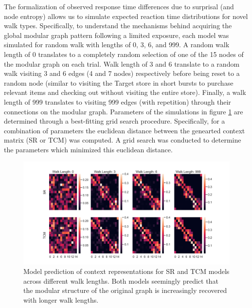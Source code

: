 The formalization of observed response time differences due to surprisal (and node entropy) allows us to simulate expected reaction time distributions for novel walk types. Specifically, to understand the mechanisms behind acquiring the global modular graph pattern following a limited exposure, each model was simulated for random walk with lengths of 0, 3, 6, and 999. A random walk length of 0 translates to a completely random selection of one of the 15 nodes of the modular graph on each trial. Walk length of 3 and 6 translate to a random walk visiting 3 and 6 edges (4 and 7 nodes) respectively before being reset to a random node (similar to visiting the Target store in short bursts to purchase relevant items and checking out without visiting the entire store). Finally, a walk length of 999 translates to visiting 999 edges (with repetition) through their connections on the modular graph. Parameters of the simulations in figure \ref{fig:SR-TCM-walklength-matrices} are determined through a best-fitting grid search procedure. Specifically, for a combination of parameters the euclidean distance between the genearted context matrix (SR or TCM) was computed. A grid search was conducted to determine the parameters which minimized this euclidean distance. 

\begin{figure}
	\centering
	\label{fig:SR-TCM-walklength-matrices}
	\includegraphics[width = \textwidth]{chapter_notebooks/chapter_2/figures/walk_length_SR_TCM_matrices.png}
	\caption{Model prediction of context representations for SR and TCM models across different walk lengths. Both models seemingly predict that the modular structure of the original graph is increasingly recovered with longer walk lengths.}
\end{figure}

